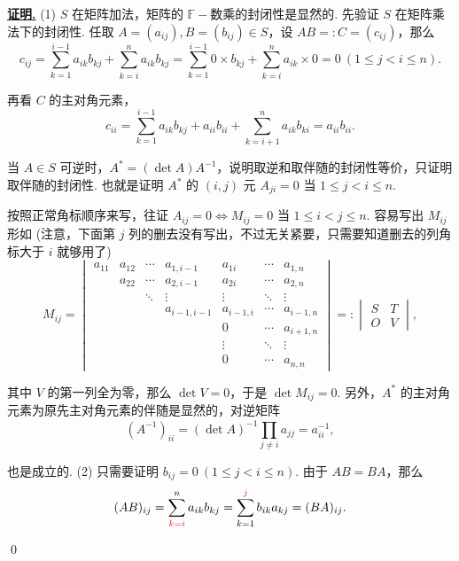 \documentclass[10pt,openany]{article}
\theoremstyle{thmstyle} %
\theoremstyle{defstyle} %
\theoremstyle{prostyle} %
\theoremstyle{exastyle}
\theoremstyle{remstyle}
\renewenvironment{proof}[1][证明]{\par\underline{\textbf{#1.}} \;\fangsong}{\qed\par}
\newcommand{\F}{\mathbb{F}}
\begin{document}
\begin{proof}
	(1) \( S \) 在矩阵加法，矩阵的 \( \F-\)数乘的封闭性是显然的. 先验证 \( S \) 在矩阵乘法下的封闭性. 任取 \( A=(a_{ij}), B=(b_{ij}) \in S \)，设 \( AB=:C=(c_{ij}) \)，那么
	\[ c_{ij}=\sum_{k=1}^{i-1} a_{ik}b_{kj}+ \sum_{k=i}^{n} a_{ik}b_{kj}= \sum_{k=1}^{i-1} 0 \times b_{kj}+ \sum_{k=i}^{n} a_{ik} \times 0=0 \ (1 \leq j<i \leq n). \]
	
	再看 \( C \) 的主对角元素，
	\[ c_{ii}= \sum_{k=1}^{i-1} a_{ik}b_{kj}+ a_{ii}b_{ii}+\sum_{k=i+1}^{n} a_{ik}b_{ki}=a_{ii}b_{ii}. \]
	
	当 \( A \in S \) 可逆时，\( A^*=(\det A) A^{-1} \)，说明取逆和取伴随的封闭性等价，只证明取伴随的封闭性. 也就是证明 \( A^* \) 的 \( (i,j) \) 元 \( A_{ji}=0 \) 当 \( 1 \leq j<i \leq n \). 
	
	按照正常角标顺序来写，往证 \( A_{ij}=0 \Leftrightarrow M_{ij}=0 \) 当 \( 1 \leq i<j \leq n \). 容易写出 \( M_{ij} \) 形如 (注意，下面第 \( j \) 列的删去没有写出，不过无关紧要，只需要知道删去的列角标大于 \( i \) 就够用了)
	\[ M_{ij}=\begin{vmatrix}
		a_{11} & a_{12} & \cdots & a_{1,i-1} & a_{1i} &  \cdots & a_{1,n} \\
		 & a_{22} & \cdots & a_{2,i-1} & a_{2i} & \cdots & a_{2,n} \\
		 & & \ddots & \vdots & \vdots & \ddots & \vdots \\
		 & & & a_{i-1,i-1} & a_{i-1,i} & \cdots & a_{i-1,n} \\
		 & & & & 0 & \cdots & a_{i+1,n} \\
		 & & & & \vdots  & \ddots & \vdots \\
		 & & & & 0 & \cdots &  a_{n,n}
	\end{vmatrix}=:\begin{vmatrix}
	S & T \\
	O & V
	\end{vmatrix}, \]
	
	其中 \( V \) 的第一列全为零，那么 \( \det V=0 \)，于是 \( \det M_{ij}=0 \). 另外，\( A^* \) 的主对角元素为原先主对角元素的伴随是显然的，对逆矩阵
	\[ (A^{-1})_{ii}= (\det A)^{-1} \prod_{j \neq i}^{} a_{jj}= a_{ii}^{-1}, \]
	
	也是成立的. (2) 只需要证明 \( b_{ij}=0 \ (1 \leq j<i \leq n) \). 由于 \( AB=BA \)，那么
	\begin{equation}
		(AB)_{ij}=\sum_{{\color{red} k=i}}^{n} a_{ik}b_{kj}=\sum_{k=1}^{{\color{red} j}} b_{ik}a_{kj}= (BA)_{ij}.
		\label{equa 4.2.1}
	\end{equation}
	

\end{proof}
\end{document}
